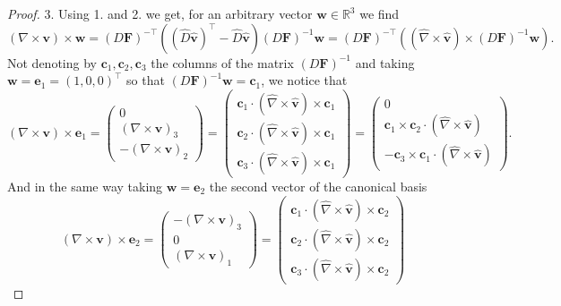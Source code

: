 \begin{proof}
3. Using 1. and 2. we get, for an arbitrary vector $\mathbf{w}\in \mathbb{R}^3$ we find
\begin{equation}\label{eq:curl_transf_1}
(\nabla\times \mathbf{v}) \times \mathbf{w} = (D \mathbf{F})^{-\top}\left( (\hat{D} \hat{\mathbf{v}})^\top - \hat{D} \hat{\mathbf{v}} \right) (D \mathbf{F})^{-1} \mathbf{w}
=(D \mathbf{F})^{-\top} \left((\hat{\nabla}\times \hat{\mathbf{v}}) \times (D \mathbf{F})^{-1}  \mathbf{w}\right). 
\end{equation}
Not denoting by $ \mathbf{c}_1, \mathbf{c}_2, \mathbf{c}_3$ the columns of the matrix $(D \mathbf{F})^{-1}$
and taking $ \mathbf{w}= \mathbf{e}_1=(1,0,0)^\top$ so that  $(D \mathbf{F})^{-1}  \mathbf{w}= \mathbf{c}_1$, we notice that
$$( \nabla\times \mathbf{v}) \times \mathbf{e}_1 = 
\begin{pmatrix}
0 \\ ( \nabla\times \mathbf{v})_3 \\ -( \nabla\times \mathbf{v})_2
\end{pmatrix}
=
\begin{pmatrix}
\mathbf{c}_1 \cdot (\hat{\nabla}\times \hat{\mathbf{v}}) \times \mathbf{c}_1 \\
\mathbf{c}_2 \cdot (\hat{\nabla}\times \hat{\mathbf{v}}) \times \mathbf{c}_1\\
\mathbf{c}_3 \cdot (\hat{\nabla}\times \hat{\mathbf{v}}) \times \mathbf{c}_1
\end{pmatrix}
= 
 \begin{pmatrix}
0 \\
\mathbf{c}_1  \times \mathbf{c}_2 \cdot (\hat{\nabla}\times \hat{\mathbf{v}})  \\
-\mathbf{c}_3\times  \mathbf{c}_1 \cdot (\hat{\nabla}\times \hat{\mathbf{v}}) 
\end{pmatrix}.
$$
And in the same way taking $ \mathbf{w}= \mathbf{e}_2$ the second vector of the canonical basis
$$( \nabla\times \mathbf{v}) \times \mathbf{e}_2 = 
\begin{pmatrix}
- ( \nabla\times \mathbf{v})_3 \\ 0\\ ( \nabla\times \mathbf{v})_1
\end{pmatrix}
=
\begin{pmatrix}
\mathbf{c}_1 \cdot (\hat{\nabla}\times \hat{\mathbf{v}}) \times \mathbf{c}_2 \\
\mathbf{c}_2 \cdot (\hat{\nabla}\times \hat{\mathbf{v}}) \times \mathbf{c}_2\\
\mathbf{c}_3 \cdot (\hat{\nabla}\times \hat{\mathbf{v}}) \times \mathbf{c}_2

\end{pmatrix}$$
\end{proof}
